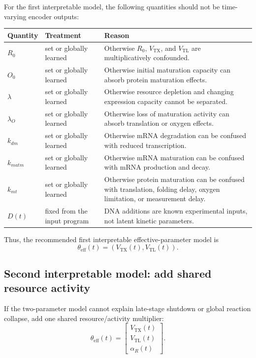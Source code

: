 \documentclass[11pt]{article}
\newcommand{\TX}{\mathrm{TX}}
\newcommand{\TL}{\mathrm{TL}}
\begin{document}
For the first interpretable model, the following quantities should not be time-varying encoder outputs:

\begin{center}
\begin{tabularx}{\textwidth}{llX}
\toprule
Quantity & Treatment & Reason \\
\midrule
$R_0$ & set or globally learned & Otherwise $R_0$, $V_{\TX}$, and $V_{\TL}$ are multiplicatively confounded. \\
$O_0$ & set or globally learned & Otherwise initial maturation capacity can absorb protein maturation effects. \\
$\lambda$ & set or globally learned & Otherwise resource depletion and changing expression capacity cannot be separated. \\
$\lambda_O$ & set or globally learned & Otherwise loss of maturation activity can absorb translation or oxygen effects. \\
$k_{dm}$ & set or globally learned & Otherwise mRNA degradation can be confused with reduced transcription. \\
$k_{matm}$ & set or globally learned & Otherwise mRNA maturation can be confused with mRNA production and decay. \\
$k_{mt}$ & set or globally learned & Otherwise protein maturation can be confused with translation, folding delay, oxygen limitation, or measurement delay. \\
$D(t)$ & fixed from the input program & DNA additions are known experimental inputs, not latent kinetic parameters. \\
\bottomrule
\end{tabularx}
\end{center}

Thus, the recommended first interpretable effective-parameter model is
\begin{equation}
    \boxed{
    \theta_{\mathrm{eff}}(t)
    =
    \left(
    V_{\TX}(t),
    V_{\TL}(t)
    \right)
    }.
\end{equation}

\subsection{Second interpretable model: add shared resource activity}

If the two-parameter model cannot explain late-stage shutdown or global reaction collapse, add one shared resource/activity multiplier:
\begin{equation}
    \theta_{\mathrm{eff}}(t)=
    \begin{bmatrix}
        V_{\TX}(t)\\
        V_{\TL}(t)\\
        \alpha_R(t)
    \end{bmatrix}.
\end{equation}
\end{document}
